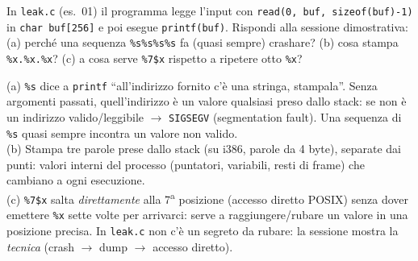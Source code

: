 \question[7]
In \lstinline|leak.c| (es.\ 01) il programma legge l'input con \lstinline|read(0, buf, sizeof(buf)-1)| in \lstinline|char buf[256]| e poi esegue \lstinline|printf(buf)|. Rispondi alla sessione dimostrativa:
(a) perché una sequenza \lstinline|%s%s%s%s| fa (quasi sempre) crashare? (b) cosa stampa \lstinline|%x.%x.%x|? (c) a cosa serve \lstinline|%7$x| rispetto a ripetere otto \lstinline|%x|?
\begin{solution}
(a) \lstinline|%s| dice a \lstinline|printf| ``all'indirizzo fornito c'è una stringa, stampala''. Senza argomenti passati, quell'indirizzo è un valore qualsiasi preso dallo stack: se non è un indirizzo valido/leggibile $\to$ \lstinline|SIGSEGV| (segmentation fault). Una sequenza di \lstinline|%s| quasi sempre incontra un valore non valido.\\
(b) Stampa tre parole prese dallo stack (su i386, parole da 4 byte), separate dai punti: valori interni del processo (puntatori, variabili, resti di frame) che cambiano a ogni esecuzione.\\
(c) \lstinline|%7$x| salta \emph{direttamente} alla 7\textsuperscript{a} posizione (accesso diretto POSIX) senza dover emettere \lstinline|%x| sette volte per arrivarci: serve a raggiungere/rubare un valore in una posizione precisa. In \lstinline|leak.c| non c'è un segreto da rubare: la sessione mostra la \emph{tecnica} (crash $\to$ dump $\to$ accesso diretto).
\end{solution}
